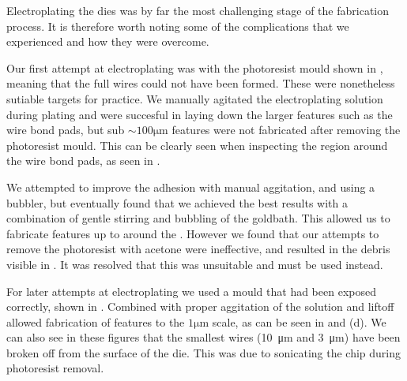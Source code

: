 Electroplating the dies was by far the most challenging stage of the
fabrication process.  It is therefore worth noting some of the complications
that we experienced and how they were overcome. 

Our first attempt at electroplating was with the photoresist mould shown in
, meaning that the full wires could not have been
formed. These were nonetheless sutiable targets for practice. We manually
agitated the electroplating solution during plating and were succesful in
laying down the larger features such as the wire bond pads, but sub
$\sim100\si{\micro\meter}$ features were not fabricated after removing the
photoresist mould. This can be clearly seen when inspecting the region around
the wire bond pads, as seen in .

We attempted to improve the adhesion with manual aggitation, and using a
bubbler, but eventually found that we achieved the best results with a
combination of gentle stirring and bubbling of the goldbath. This allowed us to
fabricate features up to around the . However we found that our attempts to remove the photoresist
with acetone were ineffective, and resulted in the debris visible in
. It was resolved that this was unsuitable
and  must be used instead.

For later attempts at electroplating we used a mould that had been exposed
correctly, shown in . Combined with proper aggitation of the
solution and liftoff allowed fabrication of features to the
$1\si{\micro\meter}$ scale, as can be seen in
 and (d). We can also see in these figures
that the smallest wires (\SI{10}{\micro\meter} and \SI{3}{\micro\meter}) have
been broken off from the surface of the die. This was due to sonicating the
chip during photoresist removal. 


